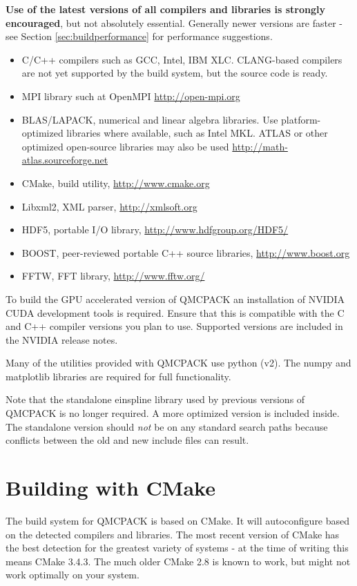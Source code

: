 \textbf{Use of the latest versions of all compilers and libraries is
strongly encouraged}, but not absolutely essential. Generally newer versions are faster - see
Section \ref{sec:buildperformance} for performance suggestions.

\begin{itemize}
\item C/C++ compilers such as GCC, Intel, IBM XLC. CLANG-based compilers
  are not yet supported by the build system, but the source code is ready.
\item MPI library such at OpenMPI \url{http://open-mpi.org}
\item BLAS/LAPACK, numerical and linear algebra libraries. Use
  platform-optimized libraries where available, such as Intel MKL.
  ATLAS or other optimized open-source libraries may also be used
  \url{http://math-atlas.sourceforge.net}
\item CMake, build utility, \url{http://www.cmake.org}
\item Libxml2, XML parser, \url{http://xmlsoft.org}
\item HDF5, portable I/O library, \url{http://www.hdfgroup.org/HDF5/}
\item BOOST, peer-reviewed portable C++ source libraries, \url{http://www.boost.org}
\item FFTW, FFT library, \url{http://www.fftw.org/}
\end{itemize}

To build the GPU accelerated version of QMCPACK an installation of
NVIDIA CUDA development tools is required. Ensure that this is
compatible with the C and C++ compiler versions you plan to
use. Supported versions are included in the NVIDIA release notes.

Many of the utilities provided with QMCPACK use python (v2). The numpy
and matplotlib libraries are required for full functionality.

Note that the standalone einspline library used by previous versions of QMCPACK
is no longer required. A more optimized version is included
inside. The standalone version should \emph{not} be on any standard
search paths because conflicts between the old and new include files
can result.

\section{Building with CMake}
\label{sec:cmake}
The build system for QMCPACK is based on CMake.  It will autoconfigure
based on the detected compilers and libraries. The most recent
version of CMake has the best detection for the greatest variety of
systems - at the time of writing this means CMake 3.4.3. The much
older CMake 2.8 is known to work, but might not work optimally on your system.

